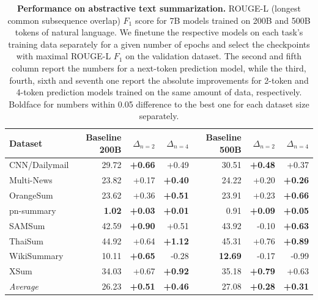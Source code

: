 
\begin{table}[ht!] 
\centering
\caption{\textbf{Performance on abstractive text summarization.} ROUGE-L (longest common subsequence overlap) $F_1$ score for 7B models trained on 200B and 500B tokens of natural language. We finetune the respective models on each task's training data separately for a given number of epochs and select the checkpoints with maximal ROUGE-L $F_1$ on the validation dataset. The second and fifth column report the numbers for a next-token prediction model, while the third, fourth, sixth and seventh one report the absolute improvements for 2-token and 4-token prediction models trained on the same amount of data, respectively.
Boldface for numbers within 0.05 difference to the best one for each dataset size separately.}
\label{tab:summarization}
\begin{tabular}{lrrrrrr}
\toprule
      Dataset &     Baseline 200B &  $\Delta_{n=2}$ &  $\Delta_{n=4}$ & Baseline 500B & $\Delta_{n=2}$ & $\Delta_{n=4}$ \\
\midrule
CNN/Dailymail &  29.72 &         \textbf{+0.66} &         +0.49 &  30.51 &         \textbf{+0.48} &         +0.37 \\
Multi-News &  23.82 &         +0.17 &         \textbf{+0.40} &  24.22 &         +0.20 &         \textbf{+0.26} \\
OrangeSum &  23.62 &         +0.36 &         \textbf{+0.51} &  23.91 &         +0.23 &         \textbf{+0.66} \\
pn-summary &   \textbf{1.02} &         \textbf{+0.03} &         \textbf{+0.01} &   0.91 &         \textbf{+0.09} &         \textbf{+0.05} \\
SAMSum &  42.59 &         \textbf{+0.90} &         +0.51 &  43.92 &        -0.10 &         \textbf{+0.63} \\
ThaiSum &  44.92 &         +0.64 &         \textbf{+1.12} &  45.31 &         +0.76 &         \textbf{+0.89} \\
WikiSummary &  10.11 &         \textbf{+0.65} &        -0.28 &  \textbf{12.69} &        -0.17 &        -0.99 \\
XSum &  34.03 &         +0.67 &         \textbf{+0.92} &  35.18 &         \textbf{+0.79} &         +0.63 \\
         \midrule
\emph{Average} &  26.23 & \textbf{+0.51} & \textbf{+0.46} & 27.08 & \textbf{+0.28} & \textbf{+0.31} \\
\bottomrule
\end{tabular}
\end{table}




